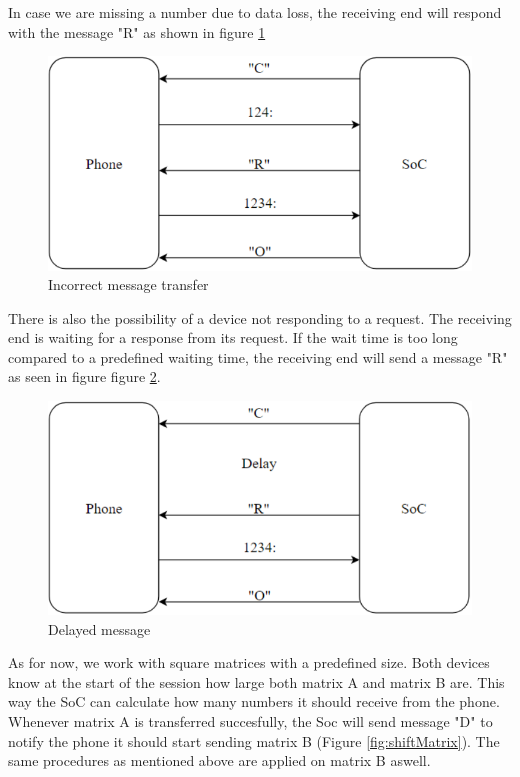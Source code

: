 \documentclass[a4paper, 11pt]{report}
\begin{document}
In case we are missing a number due to data loss, the receiving end will respond with the message "R" as shown in figure \ref{fig:incorrectMessage}

\begin{figure}[ht]
\centering
\includegraphics[scale=0.7]{images/IncorrectMsg.pdf}
\caption{Incorrect message transfer}\label{fig:incorrectMessage}
\end{figure}

There is also the possibility of a device not responding to a request. The receiving end is waiting for a response from its request. If the wait time is too long compared to a predefined waiting time, the receiving end will send a message "R" as seen in figure figure \ref{fig:delayedMessage}.

\begin{figure}[ht]
\centering
\includegraphics[scale=0.7]{images/DelayedMsg.pdf}
\caption{Delayed message}\label{fig:delayedMessage}
\end{figure}

As for now, we work with square matrices with a predefined size. Both devices know at the start of the session how large both matrix A and matrix B are. This way the SoC can calculate how many numbers it should receive from the phone. Whenever matrix A is transferred succesfully, the Soc will send message "D" to notify the phone it should start sending matrix B (Figure \ref{fig:shiftMatrix}). The same procedures as mentioned above are applied on matrix B aswell.
\end{document}
